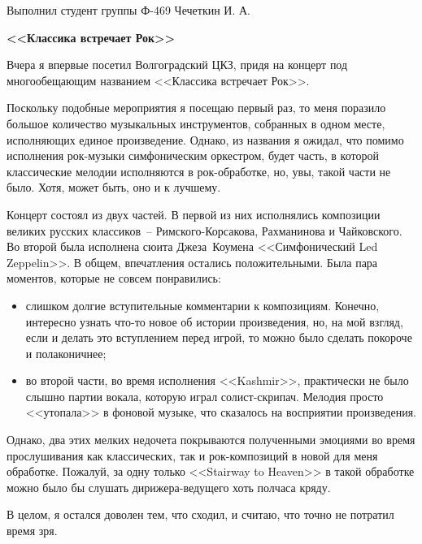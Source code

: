 \documentclass[12pt,pscyr]{hedwork}
\begin{document}
  \begin{flushright}
    Выполнил студент группы Ф-469 Чечеткин И. А.
  \end{flushright}
  \vspace{-2em}
  \begin{center}
    \bfseries <<Классика встречает Рок>>
  \end{center}

  Вчера я впервые посетил Волгоградский ЦКЗ, придя на концерт под
  многообещающим названием <<Классика встречает Рок>>.

  Поскольку подобные мероприятия я посещаю первый раз, то меня поразило большое
  количество музыкальных инструментов, собранных в одном месте, исполняющих
  единое произведение. Однако, из названия я ожидал, что помимо исполнения
  рок-музыки симфоническим оркестром, будет часть, в которой классические
  мелодии исполняются в рок-обработке, но, увы, такой части не было. Хотя, может
  быть, оно и к лучшему.

  Концерт состоял из двух частей. В первой из них исполнялись композиции великих
  русских классиков~-- Римского-Корсакова, Рахманинова и Чайковского. Во второй
  была исполнена сюита Джеза~Коумена <<Симфонический Led Zeppelin>>. В общем,
  впечатления остались положительными. Была пара моментов, которые не совсем
  понравились:
  \begin{itemize}
    \item слишком долгие вступительные комментарии к композициям. Конечно,
      интересно узнать что-то новое об истории произведения, но, на мой взгляд,
      если и делать это вступлением перед игрой, то можно было сделать покороче
      и полаконичнее;
    \item во второй части, во время исполнения <<Kashmir>>, практически не было
      слышно партии вокала, которую играл солист-скрипач. Мелодия просто
      <<утопала>> в фоновой музыке, что сказалось на восприятии произведения.
  \end{itemize}

  Однако, два этих мелких недочета покрываются полученными эмоциями во время
  прослушивания как классических, так и рок-композиций в новой для меня
  обработке. Пожалуй, за одну только <<Stairway to Heaven>> в такой обработке
  можно было бы слушать дирижера-ведущего хоть полчаса кряду.

  В целом, я остался доволен тем, что сходил, и считаю, что точно не потратил
  время зря.
\end{document}
